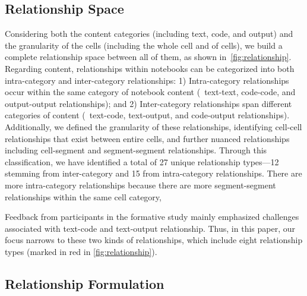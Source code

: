 \subsection{Relationship Space}
\label{sec:relationship_space}

Considering both the content categories (including text, code, and output) and the granularity of the cells (including the whole cell and  of cells), we build a complete relationship space between all of them, as shown in~\autoref{fig:relationship}.
Regarding content, relationships within notebooks can be categorized into both intra-category and inter-category relationships: 1) Intra-category relationships occur within the same category of notebook content (\ie~text-text, code-code, and output-output relationships);
and 2) Inter-category relationships span different categories of content (\ie~text-code, text-output, and code-output relationships).
Additionally, we defined the granularity of these relationships, identifying cell-cell relationships that exist between entire cells, and further nuanced relationships including cell-segment and segment-segment relationships. 
Through this classification, we have identified a total of 27 unique relationship types—12 stemming from inter-category and 15 from intra-category relationships.
There are more intra-category relationships because there are more segment-segment relationships within the same cell category,


Feedback from participants in the formative study mainly emphasized challenges associated with text-code and text-output relationship.
Thus, in this paper, our focus narrows to these two kinds of relationships, which include eight relationship types (marked in red in \autoref{fig:relationship}). 




\subsection{Relationship Formulation}
\label{sec:relationship_formulation}

